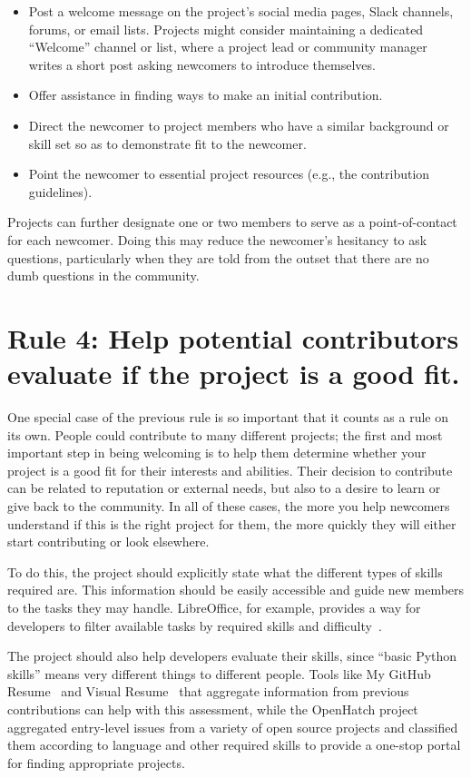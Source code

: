 \documentclass[10pt,letterpaper]{article}
\newcommand{\rulemajor}[1]{\section*{#1}}
\begin{document}
\begin{itemize}

\item
  Post a welcome message on the project's social media pages, Slack channels, forums, or email lists.
  Projects might consider maintaining a dedicated ``Welcome'' channel or list,
  where a project lead or community manager writes a short post asking newcomers to introduce themselves.

\item
  Offer assistance in finding ways to make an initial contribution.

\item
  Direct the newcomer to project members who have a similar background or skill set
  so as to demonstrate fit to the newcomer.

\item
  Point the newcomer to essential project resources (e.g., the contribution guidelines).

\end{itemize}

Projects can further designate one or two members to serve as a point-of-contact for each newcomer.
Doing this may reduce the newcomer's hesitancy to ask questions,
particularly when they are told from the outset that there are no dumb questions in the community.

\rulemajor{Rule 4: Help potential contributors evaluate if the project is a good fit.}

One special case of the previous rule is so important that it counts as a rule on its own.
People could contribute to many different projects;
the first and most important step in being welcoming is to help them determine whether
your project is a good fit for their interests and abilities.
Their decision to contribute can be related to reputation or external needs,
but also to a desire to learn or give back to the community.
In all of these cases,
the more you help newcomers understand if this is the right project for them,
the more quickly they will either start contributing or look elsewhere.

To do this,
the project should explicitly state what the different types of skills required are.
This information should be easily accessible and guide new members to the tasks they may handle.
LibreOffice,
for example,
provides a way for developers to filter available tasks by required skills and difficulty~\cite{libreoffice-filtered}.

The project should also help developers evaluate their skills,
since ``basic Python skills'' means very different things to different people.
Tools like My GitHub Resume~\cite{my-github-resume} and Visual Resume~\cite{sarma2016}
that aggregate information from previous contributions can help with this assessment,
while the OpenHatch project~\cite{openhatch} aggregated entry-level issues from a variety of open source projects
and classified them according to language and other required skills
to provide a one-stop portal for finding appropriate projects.
\end{document}
